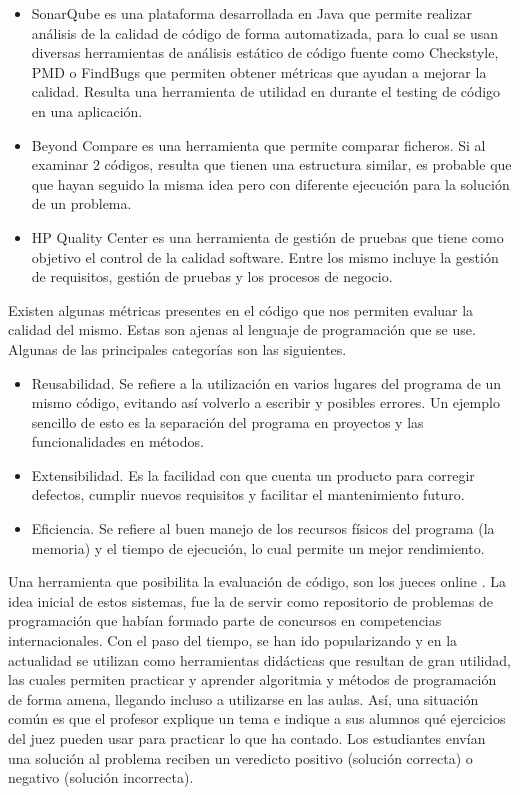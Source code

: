 \documentclass[a4paper,12pt]{book}
\begin{document}
	\begin{itemize}
		\item SonarQube es una plataforma desarrollada en Java que permite realizar análisis de la calidad de código de forma automatizada, para lo cual se usan diversas herramientas de análisis estático de código fuente como Checkstyle, PMD o FindBugs que permiten obtener métricas que ayudan a mejorar la calidad. Resulta una herramienta de utilidad en durante el testing de código en una aplicación.
		
		\item Beyond Compare es una herramienta que permite comparar ficheros. Si al examinar 2 códigos, resulta que tienen una estructura similar, es probable que que hayan seguido la misma idea pero con diferente ejecución para la solución de un problema.
		
		\item HP Quality Center es una herramienta de gestión de pruebas que tiene como objetivo el control de la calidad software. Entre los mismo incluye la gestión de requisitos, gestión de pruebas y los procesos de negocio.
	\end{itemize}
	
	Existen algunas métricas presentes en el código que nos permiten evaluar la calidad del mismo. Estas son ajenas al lenguaje de programación que se use. Algunas de las principales categorías son las siguientes.
	
	\begin{itemize}
		\item Reusabilidad. Se refiere a la utilización en varios lugares del programa de un mismo código, evitando así volverlo a escribir y posibles errores. Un ejemplo sencillo de esto es la separación del programa en proyectos y las funcionalidades en métodos.
		
		\item Extensibilidad. Es la facilidad con que cuenta un producto para corregir defectos, cumplir nuevos requisitos y facilitar el mantenimiento futuro.

		\item Eficiencia. Se refiere al buen manejo de los recursos físicos del programa (la memoria) y el tiempo de ejecución, lo cual permite un mejor rendimiento.
	\end{itemize}

	Una herramienta que posibilita la evaluación de código, son los jueces online \cite{hernandez2017feedback}. La idea inicial de estos sistemas, fue la de servir como repositorio de problemas de programación que habían formado parte de concursos en competencias internacionales. Con el paso del tiempo, se han ido popularizando y en la actualidad se utilizan como herramientas didácticas que resultan de gran utilidad, las cuales permiten practicar y aprender algoritmia y métodos de programación de forma amena, llegando incluso a utilizarse en las aulas. Así, una situación común es que el profesor explique un tema e indique a sus alumnos qué ejercicios del juez pueden usar para practicar lo que ha contado. Los estudiantes envían una solución al problema reciben un veredicto positivo (solución correcta) o negativo (solución incorrecta).
	
\end{document}
